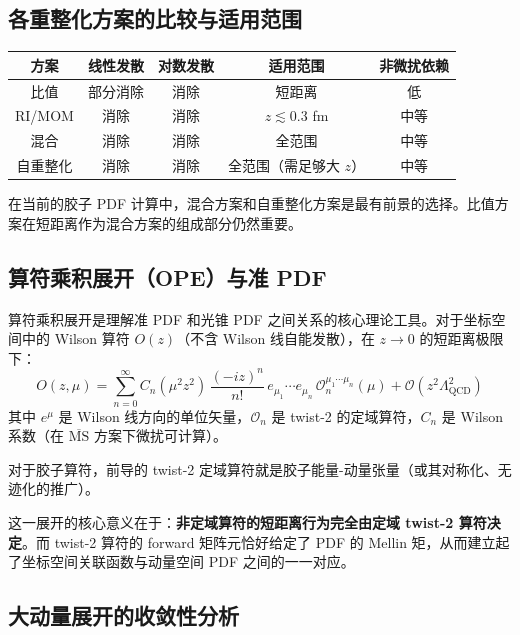 \documentclass[11pt,a4paper]{ctexart}
\newcommand{\order}[1]{\mathcal{O}(#1)}
\begin{document}
\subsection{各重整化方案的比较与适用范围}

\begin{center}
\begin{tabular}{c c c c c}
\toprule
\textbf{方案} & \textbf{线性发散} & \textbf{对数发散} & \textbf{适用范围} & \textbf{非微扰依赖} \\
\midrule
比值 & 部分消除 & 消除 & 短距离 & 低 \\
RI/MOM & 消除 & 消除 & $z \lesssim 0.3$ fm & 中等 \\
混合 & 消除 & 消除 & 全范围 & 中等 \\
自重整化 & 消除 & 消除 & 全范围（需足够大 $z$） & 中等 \\
\bottomrule
\end{tabular}
\end{center}

在当前的胶子 PDF 计算中，混合方案和自重整化方案是最有前景的选择。比值方案在短距离作为混合方案的组成部分仍然重要。

\subsection{算符乘积展开（OPE）与准 PDF}

算符乘积展开是理解准 PDF 和光锥 PDF 之间关系的核心理论工具。对于坐标空间中的 Wilson 算符 $O(z)$（不含 Wilson 线自能发散），在 $z \to 0$ 的短距离极限下：
\begin{equation}
O(z, \mu) = \sum_{n=0}^{\infty} C_n(\mu^2 z^2) \, \frac{(-iz)^n}{n!} \,
e_{\mu_1} \cdots e_{\mu_n} \, \mathcal{O}_n^{\mu_1 \cdots \mu_n}(\mu) +
\order{z^2 \Lambda_{\text{QCD}}^2}
\end{equation}
其中 $e^\mu$ 是 Wilson 线方向的单位矢量，$\mathcal{O}_n$ 是 twist-2 的定域算符，$C_n$ 是 Wilson 系数（在 $\overline{\text{MS}}$ 方案下微扰可计算）。

对于胶子算符，前导的 twist-2 定域算符就是胶子能量-动量张量（或其对称化、无迹化的推广）。

这一展开的核心意义在于：\textbf{非定域算符的短距离行为完全由定域 twist-2 算符决定}。而 twist-2 算符的 forward 矩阵元恰好给定了 PDF 的 Mellin 矩，从而建立起了坐标空间关联函数与动量空间 PDF 之间的一一对应。

\subsection{大动量展开的收敛性分析}
\end{document}
